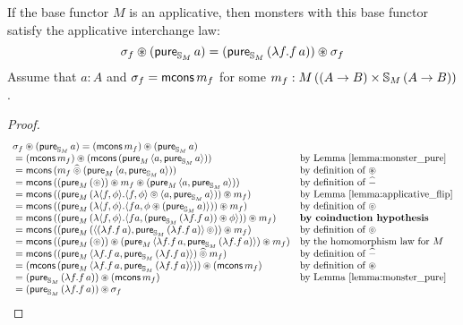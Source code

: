 \begin{lemma}
If the base functor $M$ is an applicative, then monsters with this base functor satisfy the applicative interchange law:
$$
\sigma_f \circledast (\mathsf{pure}_{\mathbb{S}_{M}}\,a) = (\mathsf{pure}_{\mathbb{S}_{M}}\,(\lambda f. f\,a)) \circledast \sigma_f
$$
Assume that $a:A$ and $\sigma_f = \mathsf{mcons}\,m_f$ for some $m_f:M\,((A\rightarrow B)\times \mathbb{S}_{M}\,(A\rightarrow B))$.
\end{lemma}
\begin{proof}
$$
\begin{array}{ll}
\sigma_f \circledast (\mathsf{pure}_{\mathbb{S}_{M}}\,a) = (\mathsf{mcons}\,m_f) \circledast (\mathsf{pure}_{\mathbb{S}_{M}}\,a) \\
{}= (\mathsf{mcons}\,m_f) \circledast (\mathsf{mcons}\,(\mathsf{pure}_M\,\langle a, \mathsf{pure}_{\mathbb{S}_{M}}\,a\rangle))
  & \mbox{by Lemma \ref{lemma:monster_pure}}\\
{}= \mathsf{mcons}\,(m_f \mathbin{\widehat{\circledcirc}} (\mathsf{pure}_M\,\langle a, \mathsf{pure}_{\mathbb{S}_{M}}\,a\rangle))
  & \mbox{by definition of }\circledast\\
{}= \mathsf{mcons}\,((\mathsf{pure}_M\,(\circledcirc)) \circledast m_f \circledast (\mathsf{pure}_M\,\langle a, \mathsf{pure}_{\mathbb{S}_{M}}\,a\rangle))
  & \mbox{by definition of }\mathbin{\widehat{-}}\\
{}= \mathsf{mcons} \, ((\mathsf{pure}_M\,(\lambda \langle f, \phi \rangle . \langle f, \phi \rangle \circledcirc \langle a, \mathsf{pure}_{\mathbb{S}_{M}}\,a \rangle)) \circledast m_f)
  & \mbox{by Lemma \ref{lemma:applicative_flip}}\\
{}= \mathsf{mcons}\,((\mathsf{pure}_M\,(\lambda \langle f, \phi \rangle . \langle f a, \phi \circledast (\mathsf{pure}_{\mathbb{S}_{M}}\,a) \rangle)) \circledast m_f)
  & \mbox{by definition of } \circledcirc \\
{}= \mathsf{mcons}\,((\mathsf{pure}_M\,(\lambda \langle f, \phi \rangle . \langle f a, (\mathsf{pure}_{\mathbb{S}_{M}}\,(\lambda f . f\, a)) \circledast \phi \rangle)) \circledast m_f)
  & \mbox{\bf by coinduction hypothesis} \\
{}= \mathsf{mcons}\,((\mathsf{pure}_M\,(\langle (\lambda f . f\, a), \mathsf{pure}_{\mathbb{S}_{M}}\,(\lambda f . f\, a) \rangle\, \circledcirc )) \circledast m_f)
  & \mbox{by definition of } \circledcirc \\
{}= \mathsf{mcons}\,((\mathsf{pure}_M\,(\circledcirc)) \circledast (\mathsf{pure}_M\,\langle \lambda f. f\,a, \mathsf{pure}_{\mathbb{S}_{M}}\,(\lambda f. f\,a)  \rangle) \circledast m_f)
  & \mbox{by the homomorphism law for }M \\
{}= \mathsf{mcons}\,((\mathsf{pure}_M\,\langle \lambda f. f\,a, \mathsf{pure}_{\mathbb{S}_{M}}\,(\lambda f. f\,a)  \rangle) \mathbin{\widehat{\circledcirc}} m_f)
  & \mbox{by definition of }\mathbin{\widehat{-}}\\
{}= (\mathsf{mcons}\,(\mathsf{pure}_M\,\langle \lambda f. f\,a, \mathsf{pure}_{\mathbb{S}_{M}}\,(\lambda f. f\,a)  \rangle)) \circledast (\mathsf{mcons}\,m_f)
  & \mbox{by definition of }\circledast \\
{}= (\mathsf{pure}_{\mathbb{S}_{M}}\,(\lambda f. f\,a)) \circledast (\mathsf{mcons}\,m_f)
  & \mbox{by Lemma \ref{lemma:monster_pure}} \\
{} = (\mathsf{pure}_{\mathbb{S}_{M}}\,(\lambda f. f\,a)) \circledast \sigma_f
\end{array}
$$
\end{proof}



